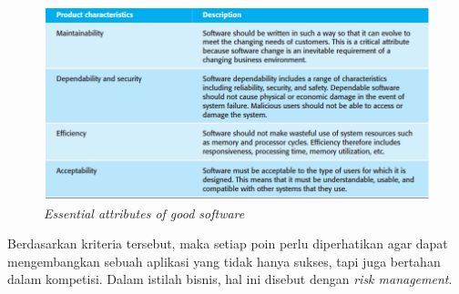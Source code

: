	\begin{figure}[H]
		\centering
		\includegraphics[width=.8\textwidth]{images/bab3/buku/essential-good-software.png}
		\caption{\textit{Essential attributes of good software}}
		\label{essential-software}
	\end{figure}
	
	\indent Berdasarkan kriteria tersebut, maka setiap poin perlu diperhatikan agar dapat mengembangkan sebuah aplikasi yang tidak hanya sukses, tapi juga bertahan dalam kompetisi. Dalam istilah bisnis, hal ini disebut dengan \textit{risk management}.
	
	
	
	
